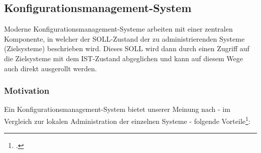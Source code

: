 \subsection{Konfigurationsmanagement-System}
Moderne Konfigurationsmanagement-Systeme arbeiten mit einer zentralen Komponente, in welcher der SOLL-Zustand der zu administrierenden Systeme (Zielsysteme) beschrieben wird. Dieses SOLL wird dann durch einen Zugriff auf die Zielsysteme mit dem IST-Zustand abgeglichen und kann auf diesem Wege auch direkt ausgerollt werden.

\subsubsection{Motivation}
Ein Konfigurationsmanagement-System bietet unserer Meinung nach - im Vergleich zur lokalen Administration der einzelnen Systeme - folgende Vorteile\footcite{whyCM}:

